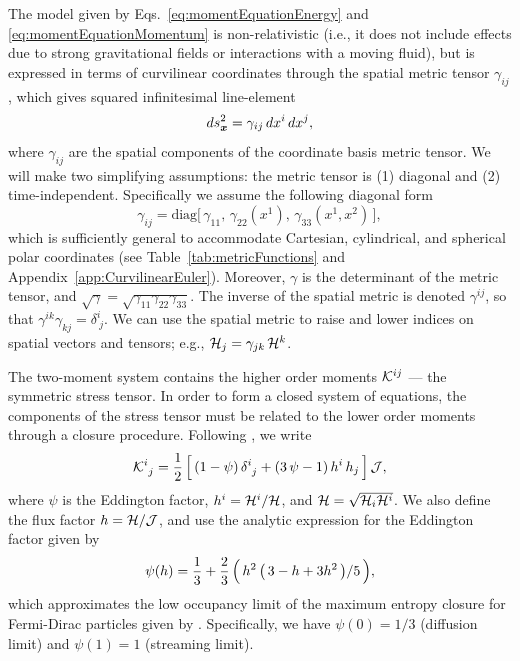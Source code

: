 \documentclass[10pt,preprint]{aastex}
\begin{document}
The model given by Eqs.~\eqref{eq:momentEquationEnergy} and \eqref{eq:momentEquationMomentum} is non-relativistic (i.e., it does not include effects due to strong gravitational fields or interactions with a moving fluid), but is expressed in terms of curvilinear coordinates through the spatial metric tensor $\gamma_{ij}$, which gives squared infinitesimal line-element
\begin{equation}
  ds_{\boldsymbol{x}}^{2}=\gamma_{ij}\,dx^{i}\,dx^{j},
\end{equation}
where $\gamma_{ij}$ are the spatial components of the coordinate basis metric tensor.  
We will make two simplifying assumptions: the metric tensor is (1) diagonal and (2) time-independent.  
Specifically we assume the following diagonal form
\begin{equation}
  \gamma_{ij}
  =\mbox{diag}\big[\,\gamma_{11},\,\gamma_{22}(x^{1}),\,\gamma_{33}(x^{1},x^{2})\,\big], 
  \label{eq:threeMetric}
\end{equation}
which is sufficiently general to accommodate Cartesian, cylindrical, and spherical polar coordinates (see Table~\ref{tab:metricFunctions} and Appendix~\ref{app:CurvilinearEuler}).  
Moreover, $\gamma$ is the determinant of the metric tensor, and $\sqrt{\gamma}=\sqrt{\gamma_{11}\gamma_{22}\gamma_{33}}$.  
The inverse of the spatial metric is denoted $\gamma^{ij}$, so that $\gamma^{ik}\gamma_{kj}=\delta^{i}_{~j}$.  
We can use the spatial metric to raise and lower indices on spatial vectors and tensors; e.g., $\mathcal{H}_{j}=\gamma_{jk}\,\mathcal{H}^{k}$.  

The two-moment system contains the higher order moments $\mathcal{K}^{ij}$ --- the symmetric stress tensor.  
In order to form a closed system of equations, the components of the stress tensor must be related to the lower order moments through a closure procedure.  
Following \citet{levermore_1984}, we write
\begin{equation}
  \mathcal{K}^{i}_{~j}
  =\frac{1}{2}\,\Big[\,(1-\psi)\,\delta^{i}_{~j}+(3\,\psi-1)\,h^{i}\,h_{j}\,\Big]\,\mathcal{J},
  \label{eq:stressTensor}
\end{equation}
where $\psi$ is the Eddington factor, $h^{i}=\mathcal{H}^{i}/\mathcal{H}$, and $\mathcal{H}=\sqrt{\mathcal{H}_{i}\mathcal{H}^{i}}$.  
We also define the flux factor $h=\mathcal{H}/\mathcal{J}$, and use the analytic expression for the Eddington factor \citep{minerbo_1978} given by 
\begin{equation}
  \psi(h)=\frac{1}{3}+\frac{2}{3}\,\Big(\,h^{2}\,\big(\,3-h+3h^{2}\,\big)/5\,\Big),
  \label{eq:eddingtonFactor}
\end{equation}
which approximates the low occupancy limit of the maximum entropy closure for Fermi-Dirac particles given by \citet{cernohorskyBludman_1994}.  
Specifically, we have $\psi(0)=1/3$ (diffusion limit) and $\psi(1)=1$ (streaming limit).  
\end{document}
